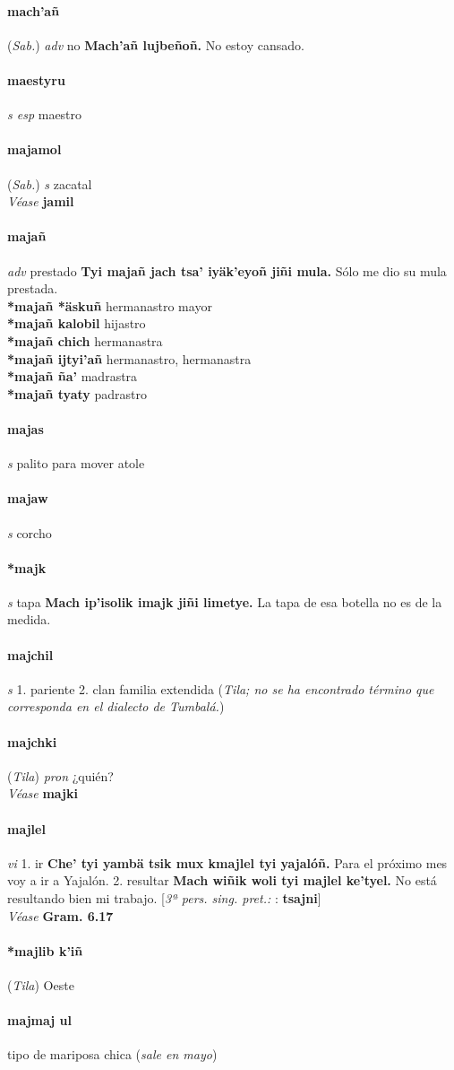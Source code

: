 \documentclass{scrbook}
\newcommand{\entry}[1]{\paragraph{#1}}
\newcommand{\onedefinition}[1]{#1.}
\newcommand{\partofspeech}[1]{\textit{#1}}
\newcommand{\spanishtranslation}[1]{#1}
\newcommand{\clarification}[1]{(\textit{#1})}
\newcommand{\cholexample}[1]{\textbf{#1}}
\newcommand{\exampletranslation}[1]{#1}
\newcommand{\alsosee}[1]{\\\textit{Véase} \textbf{#1}}
\newcommand{\relevantdialect}[1]{(\textit{#1})}
\newcommand{\secondaryentry}[1]{\\\textbf{#1}}
\newcommand{\secondtranslation}[1]{#1}
\newcommand{\conjugationtense}[1]{[\textit{#1}}
\newcommand{\otherconjugation}[1]{: \textbf{#1}]}
\begin{document}
\begin{multicols}{2}
\entry{mach'añ}
\relevantdialect{Sab.}
\partofspeech{adv}
\spanishtranslation{no}
\cholexample{Mach'añ lujbeñoñ.}
\exampletranslation{No estoy cansado.}

\entry{maestyru}
\partofspeech{s esp}
\spanishtranslation{maestro}

\entry{majamol}
\relevantdialect{Sab.}
\partofspeech{s}
\spanishtranslation{zacatal}
\alsosee{jamil}

\entry{majañ}
\partofspeech{adv}
\spanishtranslation{prestado}
\cholexample{Tyi majañ jach tsa' iyäk'eyoñ jiñi mula.}
\exampletranslation{Sólo me dio su mula prestada.}
\secondaryentry{*majañ *äskuñ}
\secondtranslation{hermanastro mayor}
\secondaryentry{*majañ kalobil}
\secondtranslation{hijastro}
\secondaryentry{*majañ chich}
\secondtranslation{hermanastra}
\secondaryentry{*majañ ijtyi'añ}
\secondtranslation{hermanastro, hermanastra}
\secondaryentry{*majañ ña'}
\secondtranslation{madrastra}
\secondaryentry{*majañ tyaty}
\secondtranslation{padrastro}

\entry{majas}
\partofspeech{s}
\spanishtranslation{palito para mover atole}

\entry{majaw}
\partofspeech{s}
\spanishtranslation{corcho}

\entry{*majk}
\partofspeech{s}
\spanishtranslation{tapa}
\cholexample{Mach ip'isolik imajk jiñi limetye.}
\exampletranslation{La tapa de esa botella no es de la medida.}

\entry{majchil}
\partofspeech{s}
\onedefinition{1}
\spanishtranslation{pariente}
\onedefinition{2}
\spanishtranslation{clan}
\spanishtranslation{familia extendida}
\clarification{Tila; no se ha encontrado término que corresponda en el dialecto de Tumbalá.}

\entry{majchki}
\relevantdialect{Tila}
\partofspeech{pron}
\spanishtranslation{¿quién?}
\alsosee{majki}

\entry{majlel}
\partofspeech{vi}
\onedefinition{1}
\spanishtranslation{ir}
\cholexample{Che' tyi yambä tsik mux kmajlel tyi yajalóñ.}
\exampletranslation{Para el próximo mes voy a ir a Yajalón.}
\onedefinition{2}
\spanishtranslation{resultar}
\cholexample{Mach wiñik woli tyi majlel ke'tyel.}
\exampletranslation{No está resultando bien mi trabajo.}
\conjugationtense{3ª pers. sing. pret.:}
\otherconjugation{tsajni}
\alsosee{Gram. 6.17}

\entry{*majlib k'iñ}
\relevantdialect{Tila}
\spanishtranslation{Oeste}

\entry{majmaj ul}
\spanishtranslation{tipo de mariposa chica}
\clarification{sale en mayo}


\end{multicols}
\end{document}
